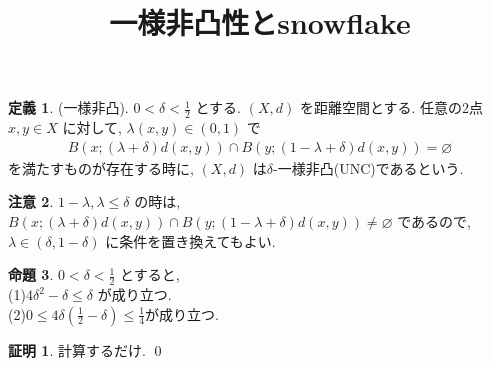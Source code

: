 \documentclass[10pt, fleqn, label-section=none]{bxjsarticle}
\title{一様非凸性とsnowflake}
\date{}
\author{}
\theoremstyle{definition}
\newtheorem{dfn}{定義}[section]
\newtheorem{prop}[dfn]{命題}
\newtheorem*{pf*}{証明}
\newtheorem{remark}[dfn]{注意}
\renewcommand{\;}{\, ; \,}
\begin{document}
\maketitle

\section{}


\begin{dfn}(一様非凸). $0 < \delta < \frac{1}{2}$ とする. $(X, d)$ を距離空間とする. 任意の2点$x, y \in X$ に対して, $\lambda(x, y) \in (0, 1)$ で 
\begin{align*} B(x;  (\lambda + \delta) d(x, y)) \cap B(y; (1 - \lambda + \delta) d(x, y)) = \varnothing \end{align*}
を満たすものが存在する時に, $(X, d)$ は$\delta $-一様非凸(UNC)であるという. 
\end{dfn}

\begin{remark}
$1 - \lambda , \lambda \leq \delta$ の時は, $B(x;  (\lambda + \delta) d(x, y)) \cap B(y; (1 - \lambda + \delta) d(x, y)) \neq \varnothing$ であるので, $\lambda \in (\delta, 1- \delta)$ に条件を置き換えてもよい. 
\end{remark}

\begin{prop}$0 < \delta < \frac{1}{2}$ とすると, \\
(1)$4 \delta ^2 - \delta \leq \delta $ が成り立つ. \\
(2)$0 \leq 4 \delta (\frac{1}{2} - \delta) \leq \frac{1}{4}$が成り立つ.
\end{prop}
\begin{pf*}
計算するだけ. 
\qed
\end{pf*}
\end{document}
